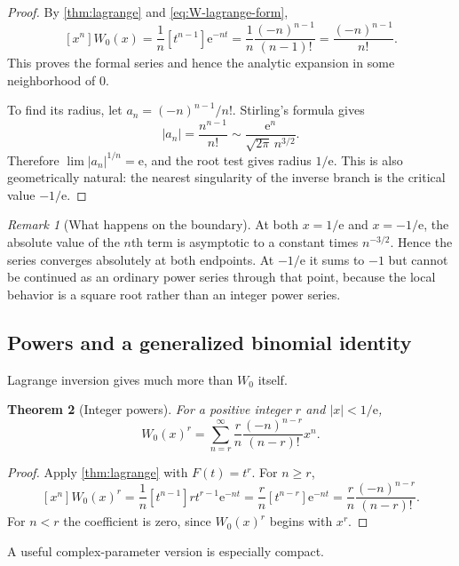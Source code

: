 \documentclass[11pt]{article}
\numberwithin{equation}{section}
\newtheorem{theorem}{Theorem}[section]
\theoremstyle{definition}
\theoremstyle{remark}
\newtheorem{remark}[theorem]{Remark}
\newcommand{\e}{\mathrm e}
\begin{document}
\begin{proof}
By \cref{thm:lagrange} and \eqref{eq:W-lagrange-form},
\[
[x^n]W_0(x)
 =\frac1n[t^{n-1}]\e^{-nt}
 =\frac1n\frac{(-n)^{n-1}}{(n-1)!}
 =\frac{(-n)^{n-1}}{n!}.
\]
This proves the formal series and hence the analytic expansion in some
neighborhood of $0$.

To find its radius, let
$a_n=(-n)^{n-1}/n!$.  Stirling's formula gives
\[
 |a_n|=\frac{n^{n-1}}{n!}
 \sim \frac{\e^n}{\sqrt{2\pi}\,n^{3/2}}.
\]
Therefore $\lim |a_n|^{1/n}=\e$, and the root test gives radius $1/\e$.
This is also geometrically natural: the nearest singularity of the inverse
branch is the critical value $-1/\e$.
\end{proof}

\begin{remark}[What happens on the boundary]
At both $x=1/\e$ and $x=-1/\e$, the absolute value of the $n$th term is
asymptotic to a constant times $n^{-3/2}$.  Hence the series converges
absolutely at both endpoints.  At $-1/\e$ it sums to $-1$ but cannot be
continued as an ordinary power series through that point, because the local
behavior is a square root rather than an integer power series.
\end{remark}

\subsection{Powers and a generalized binomial identity}

Lagrange inversion gives much more than $W_0$ itself.

\begin{theorem}[Integer powers]
\label{thm:W-powers}
For a positive integer $r$ and $|x|<1/\e$,
\begin{equation}
 W_0(x)^r
 =\sum_{n=r}^{\infty}
   \frac{r}{n}\frac{(-n)^{n-r}}{(n-r)!}x^n.           \label{eq:W-power-series}
\end{equation}
\end{theorem}

\begin{proof}
Apply \cref{thm:lagrange} with $F(t)=t^r$.  For $n\ge r$,
\[
[x^n]W_0(x)^r
 =\frac1n[t^{n-1}]r t^{r-1}\e^{-nt}
 =\frac rn[t^{n-r}]\e^{-nt}
 =\frac rn\frac{(-n)^{n-r}}{(n-r)!}.
\]
For $n<r$ the coefficient is zero, since $W_0(x)^r$ begins with $x^r$.
\end{proof}

A useful complex-parameter version is especially compact.
\end{document}
